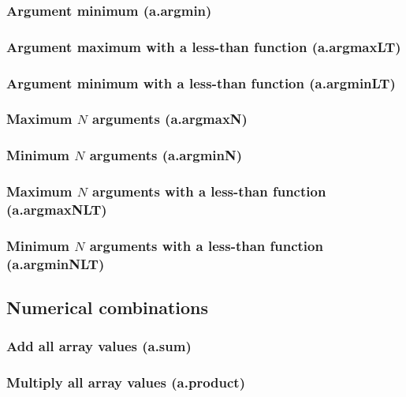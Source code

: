 \documentclass{article}
\theoremstyle{definition}
\begin{document}
\subsubsection{Argument minimum (a.argmin)}

\subsubsection{Argument maximum with a less-than function (a.argmaxLT)}

\subsubsection{Argument minimum with a less-than function (a.argminLT)}

\subsubsection{Maximum $N$ arguments (a.argmaxN)}

\subsubsection{Minimum $N$ arguments (a.argminN)}

\subsubsection{Maximum $N$ arguments with a less-than function (a.argmaxNLT)}

\subsubsection{Minimum $N$ arguments with a less-than function (a.argminNLT)}

\subsection{Numerical combinations}

\subsubsection{Add all array values (a.sum)}

\subsubsection{Multiply all array values (a.product)}
\end{document}
